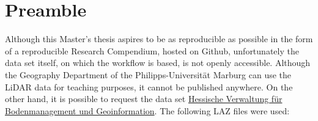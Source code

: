 \documentclass[
  12pt,
]{article}
\begin{document}
\hypertarget{preamble}{%
\section*{Preamble}\label{preamble}}

Although this Master's thesis aspires to be as reproducible as possible in the form of a reproducible Research Compendium, hosted on Github, unfortunately the data set itself, on which the workflow is based, is not openly accessible. Although the Geography Department of the Philipps-Universität Marburg can use the LiDAR data for teaching purposes, it cannot be published anywhere.
On the other hand, it is possible to request the data set \href{Hessische\%20Verwaltung\%20für\%20Bodenmanagement\%20und\%20Geoinformation}{Hessische Verwaltung für Bodenmanagement und Geoinformation}. The following LAZ files were used:
\end{document}

